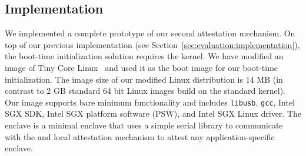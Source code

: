 %


\subsection{Implementation}

We implemented a complete prototype of our second attestation mechanism. On top of our previous \name implementation (see Section~\ref{sec:evaluation:implementation}), the boot-time initialization solution requires the \name kernel. We have modified an image of Tiny Core Linux~\cite{tinyCore} and used it as the boot image for our boot-time initialization. The image size of our modified Linux distribution is 14 MB (in contrast to 2 GB standard 64 bit Linux images build on the standard kernel). Our image supports bare minimum functionality and includes \texttt{libusb}, \texttt{gcc}, Intel SGX SDK, Intel SGX platform software (PSW), and Intel SGX Linux driver. The \name enclave is a minimal enclave that uses a simple serial library to communicate with the \device and local attestation mechanism to attest any application-specific enclave.

